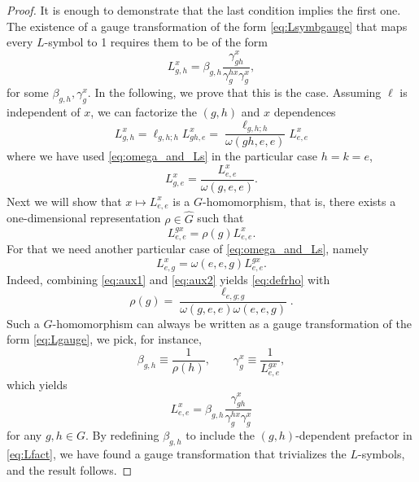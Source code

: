 \documentclass[reprint,
superscriptaddress,
amsmath,amssymb,
notitlepage,
aps,
prb,
10pt, 
tightenlines
]{revtex4-2}
\begin{document}
\begin{proof}
    It is enough to demonstrate that the last condition implies the first one. The existence of a gauge transformation of the form \eqref{eq:Lsymbgauge} that maps every $L$-symbol to 1 requires them to be of the form
    \begin{equation}
        L_{g,h}^x = \beta_{g,h}\dfrac{\gamma^x_{gh}}{\gamma^{hx}_{g}\gamma^x_g},
        \label{eq:Lgauge}
    \end{equation}
    for some $\beta_{g,h}, \gamma^{x}_g$. In the following, we prove that this is the case.
    Assuming $\ell$ is independent of $x$, we can factorize the $(g,h)$ and $x$ dependences 
    \begin{equation}
        L_{g,h}^x = \ell_{g,h;h}L^x_{gh,e}= \dfrac{\ell_{g,h;h}}{\omega(gh,e,e)}L^x_{e,e}
        \label{eq:Lfact}
    \end{equation}
    where we have used \eqref{eq:omega_and_Ls} in the particular case $h=k=e$,
    \begin{equation}
        L^x_{g,e} = \dfrac{L^x_{e,e}}{\omega(g,e,e)}.
        \label{eq:aux1}
    \end{equation}
    Next we will show that $x\mapsto L^x_{e,e}$ is a $G$-homomorphism, that is, there exists a one-dimensional representation $\rho\in\hat G$ such that 
    \begin{equation}
        L^{gx}_{e,e}=\rho(g)L^x_{e,e}.
        \label{eq:defrho}
    \end{equation}
    For that we need another particular case of \eqref{eq:omega_and_Ls}, namely
    \begin{equation}
        L^x_{e, g} = \omega(e, e, g)L^{gx}_{e,e}.
        \label{eq:aux2}
    \end{equation}
    Indeed, combining \eqref{eq:aux1} and \eqref{eq:aux2} yields \eqref{eq:defrho} with
    \begin{equation}
        \rho(g)=\dfrac{\ell_{e,g;g}}{\omega(g, e, e)\omega(e,e,g)}.
    \end{equation}
    Such a $G$-homomorphism can always be written as a gauge transformation of the form \eqref{eq:Lgauge}, we pick, for instance,
    \begin{equation}
        \beta_{g,h}\equiv\dfrac{1}{\rho(h)},\qquad \gamma^x_g\equiv \dfrac{1}{L^{gx}_{e,e}}, 
    \end{equation}
    which yields
    \begin{equation}
        L^x_{e,e} = \beta_{g,h}\dfrac{\gamma^x_{gh}}{\gamma^{hx}_{g}\gamma^x_g}
    \end{equation}
    for any $g,h\in G$. By redefining $\beta_{g,h}$ to include the $(g,h)$-dependent prefactor in \eqref{eq:Lfact}, we have found a gauge transformation that trivializes the $L$-symbols, and the result follows.
\end{proof}
\end{document}

